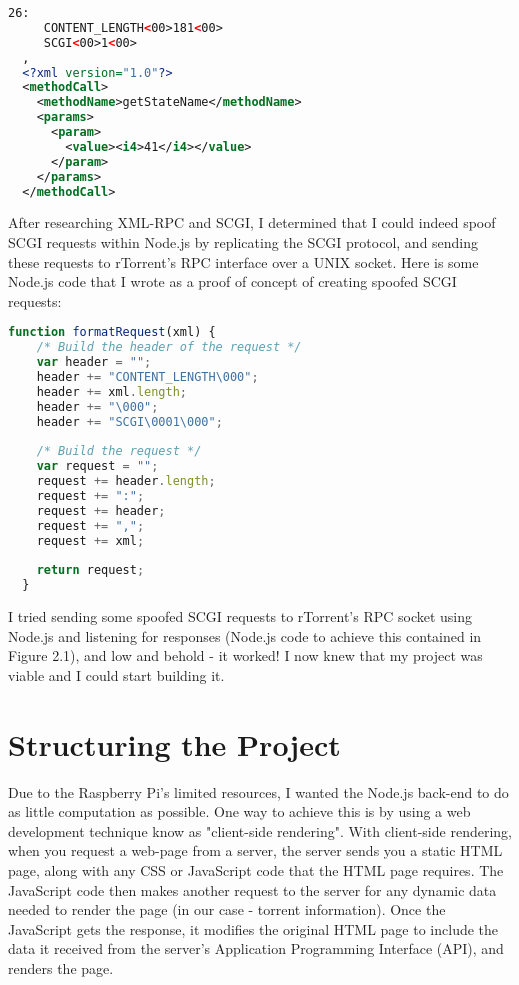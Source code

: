 \vspace{20px}
\begin{lstlisting}[caption=Layout of a SCGI request, language=XML]
  26:
     CONTENT_LENGTH<00>181<00>
     SCGI<00>1<00>
  ,
  <?xml version="1.0"?>
  <methodCall>
    <methodName>getStateName</methodName>
    <params>
      <param>
        <value><i4>41</i4></value>
      </param>
    </params>
  </methodCall>
\end{lstlisting}


After researching XML-RPC and SCGI, I determined that I could indeed spoof SCGI requests within Node.js by replicating the SCGI protocol, and sending these requests to rTorrent's RPC interface over a UNIX socket. Here is some Node.js code that I wrote as a proof of concept of creating spoofed SCGI requests:

\vspace{20px}
\begin{lstlisting}[caption=Layout of a SCGI request, language=JavaScript]
  function formatRequest(xml) {  
    /* Build the header of the request */
    var header = "";
    header += "CONTENT_LENGTH\000";
    header += xml.length;
    header += "\000";
    header += "SCGI\0001\000";
  
    /* Build the request */
    var request = "";
    request += header.length;
    request += ":";
    request += header;
    request += ",";
    request += xml;
  
    return request;
  }
\end{lstlisting}

I tried sending some spoofed SCGI requests to rTorrent's RPC socket using Node.js and listening for responses (Node.js code to achieve this contained in Figure 2.1), and low and behold - it worked! I now knew that my project was viable and I could start building it.


\section{Structuring the Project}
Due to the Raspberry Pi's limited resources, I wanted the Node.js back-end to do as little computation as possible. One way to achieve this is by using a web development technique know as "client-side rendering". With client-side rendering, when you request a web-page from a server, the server sends you a static HTML page, along with any CSS or JavaScript code that the HTML page requires. The JavaScript code then makes another request to the server for any dynamic data needed to render the page (in our case - torrent information). Once the JavaScript gets the response, it modifies the original HTML page to include the data it received from the server's Application Programming Interface (API), and renders the page.


